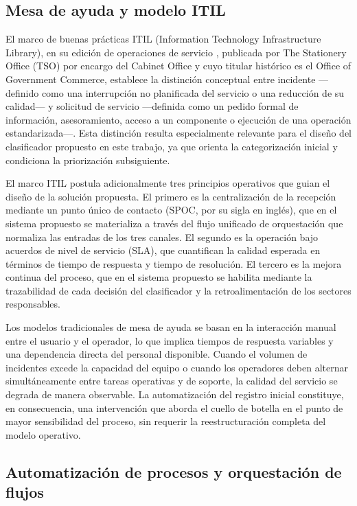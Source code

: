 \subsection{Mesa de ayuda y modelo ITIL}\label{subsec:mesa-ayuda-itil}

El marco de buenas prácticas ITIL (Information Technology Infrastructure Library), en su edición de operaciones de servicio \parencite{OGC2011_itil}, publicada por The Stationery Office (TSO) por encargo del Cabinet Office y cuyo titular histórico es el Office of Government Commerce, establece la distinción conceptual entre incidente ---definido como una interrupción no planificada del servicio o una reducción de su calidad--- y solicitud de servicio ---definida como un pedido formal de información, asesoramiento, acceso a un componente o ejecución de una operación estandarizada---. Esta distinción resulta especialmente relevante para el diseño del clasificador propuesto en este trabajo, ya que orienta la categorización inicial y condiciona la priorización subsiguiente.

El marco ITIL postula adicionalmente tres principios operativos que guian el diseño de la solución propuesta. El primero es la centralización de la recepción mediante un punto único de contacto (SPOC, por su sigla en inglés), que en el sistema propuesto se materializa a través del flujo unificado de orquestación que normaliza las entradas de los tres canales. El segundo es la operación bajo acuerdos de nivel de servicio (SLA), que cuantifican la calidad esperada en términos de tiempo de respuesta y tiempo de resolución. El tercero es la mejora continua del proceso, que en el sistema propuesto se habilita mediante la trazabilidad de cada decisión del clasificador y la retroalimentación de los sectores responsables.

Los modelos tradicionales de mesa de ayuda se basan en la interacción manual entre el usuario y el operador, lo que implica tiempos de respuesta variables y una dependencia directa del personal disponible. Cuando el volumen de incidentes excede la capacidad del equipo o cuando los operadores deben alternar simultáneamente entre tareas operativas y de soporte, la calidad del servicio se degrada de manera observable. La automatización del registro inicial constituye, en consecuencia, una intervención que aborda el cuello de botella en el punto de mayor sensibilidad del proceso, sin requerir la reestructuración completa del modelo operativo.

\subsection{Automatización de procesos y orquestación de flujos}\label{subsec:automatizacion-orquestacion}

